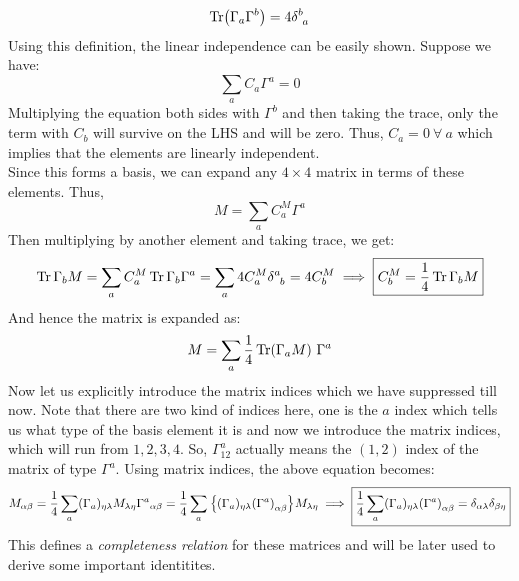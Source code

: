 $$\Tr(\Gamma_a \Gamma^b) = 4\delt{b}{a}$$
Using this definition, the linear independence can be easily shown. Suppose we have:
$$\sum\limits_{a}C_a \Gamma^a = 0$$
Multiplying the equation both sides with $\Gamma^b$ and then taking the trace, only the term with $C_b$ will survive on the LHS and will be zero. Thus, $C_a=0\ \forall \ a $ which implies that the elements are linearly independent. \\[0.2cm]
Since this forms a basis, we can expand any $4\times 4$ matrix in terms of these elements. Thus,
$$M = \sum\limits_a C_a^M \Gamma^a$$
Then multiplying by another element and taking trace, we get:
$$\Tr\Gamma_b M = \sum\limits_a C^M_a \Tr \Gamma_b\Gamma^a = \sum\limits_a 4C^M_a \delt{a}{b} = 4 C^M_b \implies \boxed{ C^M_b = \frac{1}{4}\Tr\Gamma_b M}$$
And hence the matrix is expanded as:
\begin{align}\label{eqn:expand}
    M =\sum\limits_a \frac{1}{4} \Tr(\Gamma_a M)\ \Gamma^a
\end{align}
Now let us explicitly introduce the matrix indices which we have suppressed till now. Note that there are two kind of indices here, one is the $a$ index which tells us what type of the basis element it is and now we introduce the matrix indices, which will run from $1,2,3,4$. So, $\Gamma^{a}_{12}$ actually means the $(1,2)$ index of the matrix of type $\Gamma^a$. Using matrix indices, the above equation becomes:
\begin{equation}\label{eqn:complete}
    M_{\alpha\beta} =\frac{1}{4} \sum\limits_{a} (\Gamma_{a})_{\eta \lambda}M_{\lambda \eta} {\Gamma^a}_{\alpha\beta} = \frac{1}{4}\sum\limits_{a} \qty{(\Gamma_{a})_{\eta \lambda} {(\Gamma^a)}_{\alpha\beta}} M_{\lambda \eta}\implies \boxed{\frac{1}{4}\sum\limits_a (\Gamma_{a})_{\eta \lambda} {(\Gamma^a)}_{\alpha\beta} = \delta_{\alpha\lambda}\delta_{\beta\eta}}
\end{equation}
This defines a \textit{completeness relation} for these matrices and will be later used to derive some important identitites. 
